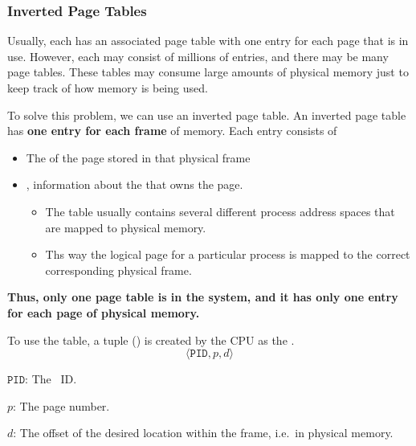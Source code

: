 \subsubsection{Inverted Page Tables}\label{subsubsec:Inverted_Page_Tables}
Usually, each  has an associated page table with one entry for each page that is in use.
However, each  may consist of millions of entries, and there may be many page tables.
These tables may consume large amounts of physical memory just to keep track of how memory is being used.

To solve this problem, we can use an inverted page table.
An inverted page table has \textbf{one entry for each frame} of memory.
Each entry consists of
\begin{itemize}[noitemsep]
\item The  of the page stored in that physical frame
\item {}, information about the  that owns the page.
  \begin{itemize}[noitemsep]
  \item The table usually contains several different process address spaces that are mapped to physical memory.
  \item Ths way the logical page for a particular process is mapped to the correct corresponding physical frame.
  \end{itemize}
\end{itemize}

\begin{blackbox}
  {\large{\textbf{Thus, only one page table is in the system, and it has only one entry for each page of physical memory.}}}
\end{blackbox}

To use the table, a tuple () is created by the CPU as the .
\begin{equation}\label{eq:Inverted_Hash_Table_Tuple}
  \langle \mathtt{PID}, p, d \rangle
\end{equation}
\begin{description}[noitemsep]
\item $\mathtt{PID}$: The ~ID.\@
\item $p$: The page number.
\item $d$: The offset of the desired location within the frame, i.e.\ in physical memory.
\end{description}

